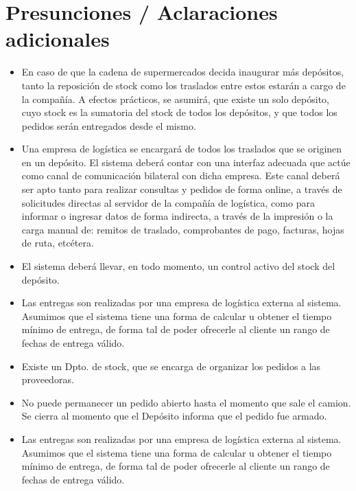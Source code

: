 
\section{Presunciones / Aclaraciones adicionales}
  
\begin{itemize}

  \item En caso de que la cadena de supermercados decida inaugurar más depósitos, tanto la reposición de stock como los traslados entre estos estarán a cargo de la compañía. A efectos prácticos, se asumirá, que existe un solo depósito, cuyo stock es la sumatoria del stock de todos los depósitos, y que todos los pedidos serán entregados desde el mismo.

  \item Una empresa de logística se encargará de todos los traslados que se originen en un depósito. El sistema deberá contar con una interfaz adecuada que actúe como canal de comunicación bilateral con dicha empresa. Este canal deberá ser apto tanto para realizar consultas y pedidos de forma online, a través de solicitudes directas al servidor de la compañía de logística, como para informar o ingresar datos de forma indirecta, a través de la impresión o la carga manual de: remitos de traslado, comprobantes de pago, facturas, hojas de ruta, etcétera.

  \item El sistema deberá llevar, en todo momento, un control activo del stock del depósito.

  \item Las entregas son realizadas por una empresa de logística externa al sistema. Asumimos que el sistema tiene una forma de calcular u obtener el tiempo mínimo de entrega, de forma tal de poder ofrecerle al cliente un rango de fechas de entrega válido.

  \item Existe un Dpto. de stock, que se encarga de organizar los pedidos a las proveedoras. 

  \item No puede permanecer un pedido abierto hasta el momento que sale el camion. Se cierra al momento que el Depósito informa que el pedido fue armado. 

  \item Las entregas son realizadas por una empresa de logística externa al sistema. Asumimos que el sistema tiene una forma de calcular u obtener el tiempo mínimo de entrega, de forma tal de poder ofrecerle al cliente un rango de fechas de entrega válido.

\end{itemize}

